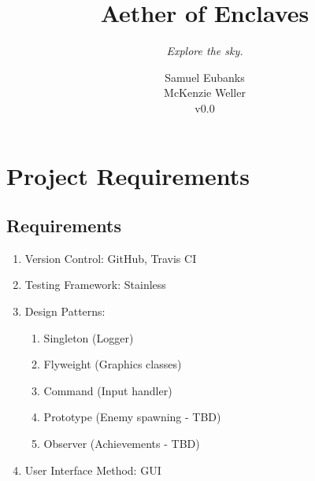 \documentclass[a4paper]{scrreprt}
\title{Aether of Enclaves}
\subtitle{\textit{Explore the sky.}}
\author{
Samuel Eubanks\\
McKenzie Weller\\
v0.0
}
\begin{document}
\maketitle

\tableofcontents


\chapter{Project Requirements}

\section{Requirements}
\begin{enumerate}
   \item Version Control: GitHub, Travis CI
   \item Testing Framework: Stainless
   \item Design Patterns:
   \begin{enumerate}
     \item Singleton (Logger)
     \item Flyweight (Graphics classes)
     \item Command (Input handler)
     \item Prototype (Enemy spawning - TBD)
     \item Observer (Achievements - TBD)
   \end{enumerate}
   \item User Interface Method: GUI
\end{enumerate}
\end{document}
